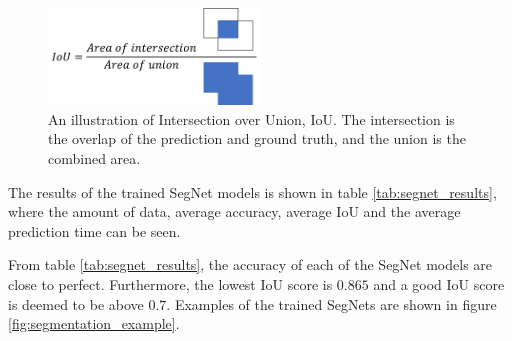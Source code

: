 \documentclass[../main.tex]{subfiles}
\begin{document}
\begin{figure}[H]
    \centering
    \includegraphics[width=0.5\textwidth]{figures/segmentation/iou.png}
    \caption{An illustration of Intersection over Union, IoU. The intersection is the overlap of the prediction and ground truth, and the union is the combined area.}
    \label{fig:iou_calculation}
\end{figure}

The results of the trained SegNet models is shown in table \ref{tab:segnet_results}, where the amount of data, average accuracy, average IoU and the average prediction time can be seen. 

\begin{table}[H]
\centering
{}
\caption{Results of the implemented SegNet models.}
\label{tab:segnet_results}
\end{table}

From table \ref{tab:segnet_results}, the accuracy of each of the SegNet models are close to perfect. Furthermore, the lowest IoU score is $0.865$ and a good IoU score is deemed to be above $0.7$. Examples of the trained SegNets are shown in figure \ref{fig:segmentation_example}.
\end{document}
